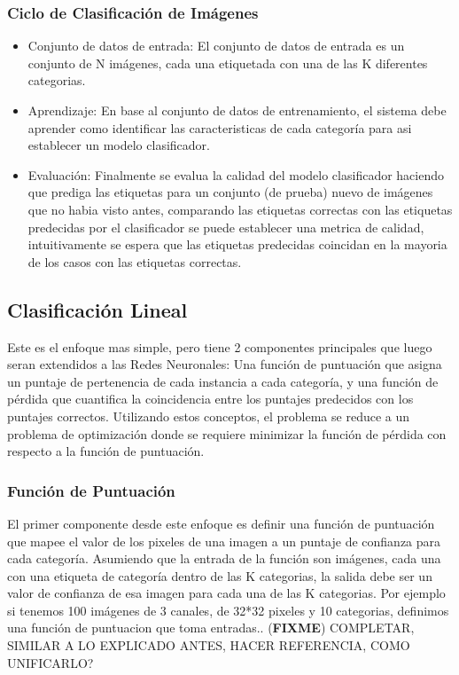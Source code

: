 \documentclass[a4paper,11pt,spanish]{book}
\newcommand*{\FIXME}[1]{{(\textbf{FIXME}) {#1}}}
\begin{document}
	\subsubsection {Ciclo de Clasificación de Imágenes}
	  \begin{itemize}
	    \item Conjunto de datos de entrada: El conjunto de datos de entrada es un conjunto de N imágenes, cada una etiquetada con una de las K diferentes categorias.  
	    \item Aprendizaje: En base al conjunto de datos de entrenamiento, el sistema debe aprender como identificar las caracteristicas de cada categoría para asi establecer un modelo clasificador.
	    \item Evaluación: Finalmente se evalua la calidad del modelo clasificador haciendo que prediga las etiquetas para un conjunto (de prueba) nuevo de imágenes que no habia visto antes, comparando las 
	    etiquetas correctas con las etiquetas predecidas por el clasificador se puede establecer una metrica de calidad, intuitivamente se espera que las etiquetas predecidas coincidan en la mayoria
	    de los casos con las etiquetas correctas.
	  \end{itemize}
      
    \subsection{Clasificación Lineal}
      Este es el enfoque mas simple, pero tiene 2 componentes principales que luego seran extendidos a las Redes Neuronales: Una función de puntuación que asigna un puntaje de pertenencia de cada instancia a cada categoría, 
      y una función de pérdida que cuantifica la coincidencia entre los puntajes predecidos con los puntajes correctos.
      Utilizando estos conceptos, el problema se reduce a un problema de optimización donde se requiere minimizar la función de pérdida con respecto a la función de puntuación.

      \subsubsection{Función de Puntuación}
	El primer componente desde este enfoque es definir una función de  puntuación que mapee el valor de los pixeles de una imagen a un puntaje de confianza para cada categoría.
	Asumiendo que la entrada de la función son imágenes, cada una con una etiqueta de categoría dentro de las K categorias, la salida debe ser un valor de confianza de esa imagen 
	para cada una de las K categorias.
	Por ejemplo si tenemos 100 imágenes de 3 canales, de 32*32 pixeles y 10 categorias, definimos una función de puntuacion que toma entradas..
	\FIXME{COMPLETAR, SIMILAR A LO EXPLICADO ANTES, HACER REFERENCIA, COMO UNIFICARLO?}
\end{document}
